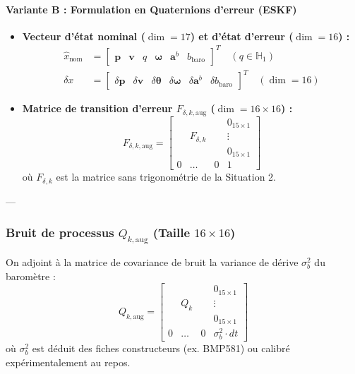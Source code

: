 \documentclass[../Formulations_Kalman.tex]{subfiles}
\begin{document}
\paragraph{Variante B : Formulation en Quaternions d'erreur (ESKF)}
\begin{itemize}
    \item \textbf{Vecteur d'état nominal ($\dim = 17$) et d'état d'erreur ($\dim = 16$) :}
    \begin{align}
    \hat{x}_{\text{nom}} &= \begin{bmatrix} \mathbf{p} & \mathbf{v} & q & \boldsymbol{\omega} & \mathbf{a}^b & b_{\text{baro}} \end{bmatrix}^T \quad (q \in \mathbb{H}_1) \\
    \delta x &= \begin{bmatrix} \delta\mathbf{p} & \delta\mathbf{v} & \delta\boldsymbol{\theta} & \delta\boldsymbol{\omega} & \delta\mathbf{a}^b & \delta b_{\text{baro}} \end{bmatrix}^T \quad (\dim = 16)
    \end{align}
    \item \textbf{Matrice de transition d'erreur $F_{\delta, k,\text{aug}}$ ($\dim = 16 \times 16$) :}
    \begin{equation}
    F_{\delta, k,\text{aug}} = \begin{bmatrix}
    & & & 0_{15\times1} \\
    & F_{\delta, k} & & \vdots \\
    & & & 0_{15\times1} \\
    0 & \dots & 0 & 1
    \end{bmatrix}
    \end{equation}
    où $F_{\delta, k}$ est la matrice sans trigonométrie de la Situation 2.
\end{itemize}

---

\subsubsection{Bruit de processus $Q_{k,\text{aug}}$ (Taille $16 \times 16$)}
On adjoint à la matrice de covariance de bruit la variance de dérive $\sigma_b^2$ du baromètre :
\begin{equation}
Q_{k, \text{aug}} = \begin{bmatrix}
& & & 0_{15\times1} \\
& Q_k & & \vdots \\
& & & 0_{15\times1} \\
0 & \dots & 0 & \sigma_{b}^2 \cdot dt
\end{bmatrix}
\end{equation}
où $\sigma_b^2$ est déduit des fiches constructeurs (ex. BMP581) ou calibré expérimentalement au repos.
\end{document}
